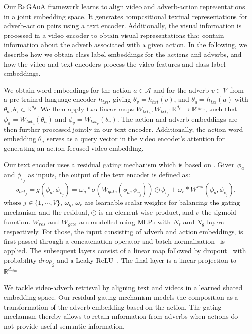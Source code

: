 \documentclass[table]{bmvc2k}
\newcommand{\modelName}{\textsc{ReGAdA}\xspace}
\begin{document}
Our \modelName framework learns to align video and adverb-action representations in a joint embedding space. It generates compositional textual representations for adverb-action pairs using a text encoder. Additionally, the visual information is processed in a video encoder to obtain visual representations that contain information about the adverb associated with a given action.
In the following, we describe how we obtain class label embeddings for the actions and adverbs, and how the video and text encoders process the video features and class label embeddings. 

We obtain word embeddings for the action $a\in \mathcal{A}$ and for the adverb $v\in \mathcal{V}$ from a pre-trained language encoder $h_{txt}$, giving $\theta_{v}=h_{txt}(v)$, and $\theta_{a}=h_{txt}(a)$ with $\theta_a, \theta_v \in \mathbb{R}^{d_{\theta}}$.
We then apply two linear maps $W_{txt_a}, W_{txt_v}: \mathbb{R}^{d_{\theta}} \xrightarrow{} \mathbb{R}^{d_{dim}}$, such that $\phi_a=W_{{txt}_a}(\theta_a)$ and $\phi_v=W_{{txt}_v}(\theta_v)$.
The action and adverb embeddings are then further processed jointly in our text encoder. Additionally, the action word embedding $\theta_{a}$ serves as a query vector in the video encoder's attention for generating an action-focused video embedding.

Our text encoder uses a residual gating mechanism which is based on \cite{vo2019composing}. Given $\phi_{a}$ and $\phi_{v_j}$ as inputs, the output of the text encoder is defined as:
\begin{equation}
    o_{txt_j} = g(\phi_a,\phi_{v_j})=\omega_g*
    \sigma(W_{gate}(\phi_a,\phi_{v_j})) \odot \phi_{v_j}
+\omega_r*W^{res}(\phi_{a}, \phi_{v_j}),
\end{equation}
where $j\in \{1,\cdots,V\}$, $\omega_{g}$, $\omega_{r}$ are learnable scalar weights for balancing the gating mechanism and the residual, $\odot$ is an element-wise product, and $\sigma$ the sigmoid function.
$W_{res}$ and $W_{gate}$ are modelled using MLPs with $N_r$ and $N_g$ layers respectively. For those, the input consisting of adverb and action embeddings, is first passed through a concatenation operator and batch normalisation~\cite{ioffe2015batch} is applied. The subsequent layers consist of a linear map followed by dropout~\cite{srivastava2014dropout} with probability $drop_g$ and a Leaky ReLU~\cite{xu2015empirical}.
The final layer is a linear projection to $\mathbb{R}^{d_{dim}}$.

We tackle video-adverb retrieval by aligning text and videos in a learned shared embedding space. Our residual gating mechanism models the composition as a transformation of the adverb embedding based on the action. The gating mechanism thereby allows to retain information from adverbs when actions do not provide useful semantic information. 
\end{document}
